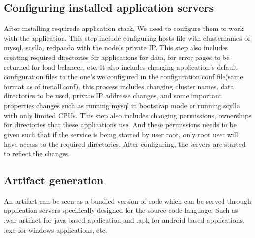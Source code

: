 \documentclass[12pt,a4paper,oneside]{report}
\begin{document}
\subsection{Configuring installed application servers}
\par\hspace{1cm}After installing requirede application stack, We need to configure them to work with the application. This step include configuring hosts file with clusternames of mysql, scylla, redpanda with the node's private IP. This step also includes creating required directories for applications for data, for error pages to be returned for load balancer, etc. It also includes changing application's default configuration files to the one's we configured in the configuration.conf file(same format as of install.conf), this process includes changing cluster names, data directories to be used, private IP addresse changes, and some important properties changes such as running mysql in bootstrap mode or running scylla with only limited CPUs. This step also includes changing permissions, ownerships for directories that these applications use. And these permissions needs to be given such that if the service is being started by user root, only root user will have access to the required directories. After configuring, the servers are started to reflect the changes.

\subsection{Artifact generation}
\par\hspace{1cm} An artifact can be seen as a bundled version of code which can be served through application servers specifically designed for the source code language. Such as .war artifact for java based application and .apk for android based applications, .exe for windows applications, etc.
\end{document}
